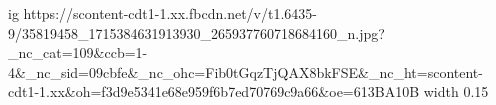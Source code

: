  
 
 
 
 

\par
\ifcmt
  ig https://scontent-cdt1-1.xx.fbcdn.net/v/t1.6435-9/35819458_1715384631913930_265937760718684160_n.jpg?_nc_cat=109&ccb=1-4&_nc_sid=09cbfe&_nc_ohc=Fib0tGqzTjQAX8bkFSE&_nc_ht=scontent-cdt1-1.xx&oh=f3d9e5341e68e959f6b7ed70769c9a66&oe=613BA10B
  width 0.15
\fi

